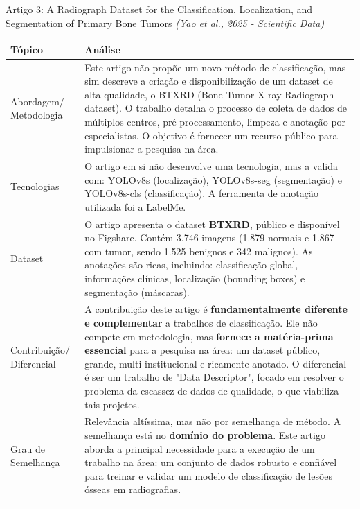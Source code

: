 \documentclass[12pt, a4paper]{article}
\begin{document}
\begin{fichabox}{{Artigo 3: A Radiograph Dataset for the Classification, Localization, and Segmentation of Primary Bone Tumors}}
\textit{(Yao et al., 2025 - Scientific Data)}

\begin{longtable}{@{} B L{10.5cm} @{}}
    \toprule
    \textbf{Tópico} & \textbf{Análise} \\
    \midrule
    \endhead
    
    Abordagem/ Metodologia & Este artigo não propõe um novo método de classificação, mas sim descreve a criação e disponibilização de um dataset de alta qualidade, o BTXRD (Bone Tumor X-ray Radiograph dataset). O trabalho detalha o processo de coleta de dados de múltiplos centros, pré-processamento, limpeza e anotação por especialistas. O objetivo é fornecer um recurso público para impulsionar a pesquisa na área. \\
    \addlinespace
    
    Tecnologias & O artigo em si não desenvolve uma tecnologia, mas a valida com: YOLOv8s (localização), YOLOv8s-seg (segmentação) e YOLOv8s-cls (classificação). A ferramenta de anotação utilizada foi a LabelMe. \\
    \addlinespace
    
    Dataset & O artigo apresenta o dataset \textbf{BTXRD}, público e disponível no Figshare. Contém 3.746 imagens (1.879 normais e 1.867 com tumor, sendo 1.525 benignos e 342 malignos). As anotações são ricas, incluindo: classificação global, informações clínicas, localização (bounding boxes) e segmentação (máscaras). \\
    \addlinespace
    
    Contribuição/ Diferencial & A contribuição deste artigo é \textbf{fundamentalmente diferente e complementar} a trabalhos de classificação. Ele não compete em metodologia, mas \textbf{fornece a matéria-prima essencial} para a pesquisa na área: um dataset público, grande, multi-institucional e ricamente anotado. O diferencial é ser um trabalho de "Data Descriptor", focado em resolver o problema da escassez de dados de qualidade, o que viabiliza tais projetos. \\
    \addlinespace
    
    Grau de Semelhança & Relevância altíssima, mas não por semelhança de método. A semelhança está no \textbf{domínio do problema}. Este artigo aborda a principal necessidade para a execução de um trabalho na área: um conjunto de dados robusto e confiável para treinar e validar um modelo de classificação de lesões ósseas em radiografias. \\
    \addlinespace
    

\end{longtable}
\end{fichabox}
\end{document}
